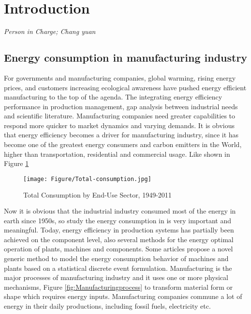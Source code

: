 





\newpage
\section{Introduction}
\textit{Person in Charge; Chang yuan}

\subsection{Energy consumption in manufacturing industry}
For governments and manufacturing companies, global warming, rising energy prices, and customers increasing ecological awareness have pushed energy efficient manufacturing to the top of the agenda. The integrating energy efficiency performance in production management, gap analysis between industrial needs and scientific literature. Manufacturing companies need greater capabilities to respond more quicker \cite{Ghani2012} to market dynamics and varying demands. It is obvious that energy efficiency becomes a driver for manufacturing industry, since it has become one of the greatest energy consumers and carbon emitters in the World, higher than transportation, residential and commercial usage. Like shown in Figure \ref{fig:TotalConsumption} 

\begin{figure}[h!]
	\centering
	\texttt{[image: Figure/Total-consumption.jpg]}
	\caption{Total Consumption by End-Use Sector, 1949-2011 \cite{Apostolos2013}}
	\label{fig:TotalConsumption}
\end{figure}

Now it is obvious that the industrial industry consumed most of the energy in earth since 1950s, so study the energy consumption in is very important and meaningful. Today, energy efficiency in production systems has partially been achieved on the component level, also several methods for the energy optimal operation of plants, machines and components.  Some articles propose a novel generic method to model the energy consumption behavior of machines and plants based on a statistical discrete event formulation. Manufacturing is the major processes of manufacturing industry and it uses one or more physical mechanisms, Figure \ref{fig:Manufacturingprocess} to transform material form or shape which requires energy inputs.  Manufacturing companies commune a lot of energy in their daily productions, including fossil fuels, electricity etc.

